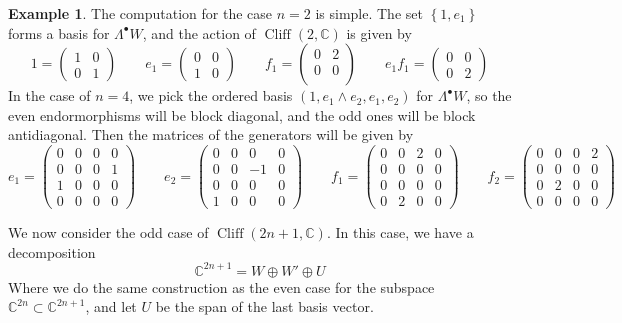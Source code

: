\documentclass[psamsfonts]{amsart}
\theoremstyle{definition}
\newtheorem{exmp}[thm]{Example}
\theoremstyle{remark}
\newcommand{\C}{\mathbb{C}}
\newcommand{\set}[1]{\left\lbrace #1 \right\rbrace}
\DeclareMathOperator{\Cliff}{Cliff}
\begin{document}
\begin{exmp}
The computation for the case $n = 2$ is simple. The set $\set{1, e_1}$ forms a basis for $\Lambda^\bullet W$, and the action of $\Cliff(2,\C)$ is given by
\[
1 = \begin{pmatrix}
1 & 0 \\
0 & 1
\end{pmatrix} \qquad e_1 = \begin{pmatrix}
0 & 0 \\
1 & 0
\end{pmatrix} \qquad f_1 = \begin{pmatrix}
0 & 2 \\
0 & 0 \\
\end{pmatrix} \qquad e_1f_1 = \begin{pmatrix}
0 & 0 \\
0 & 2
\end{pmatrix}
\]
In the case of $n=4$, we pick the ordered basis $(1, e_1 \wedge e_2, e_1, e_2)$ for $\Lambda^\bullet W$, so the even endormorphisms will be block diagonal, and the odd ones will be block antidiagonal. Then the matrices of the generators will be given by
\[
e_1 = \begin{pmatrix}
0 & 0 & 0 & 0 \\
0 & 0 & 0 & 1 \\
1 & 0 & 0 & 0 \\
0 & 0 & 0 & 0
\end{pmatrix} \qquad e_2 = \begin{pmatrix}
0 & 0 & 0 & 0 \\
0 & 0 & -1 & 0 \\
0 & 0 & 0 & 0 \\
1 & 0 & 0 & 0 
\end{pmatrix} \qquad f_1 = \begin{pmatrix}
0 & 0 & 2 & 0 \\
0 & 0 & 0 & 0 \\
0 & 0 & 0 & 0 \\
0 & 2 & 0 & 0
\end{pmatrix} \qquad f_2 = \begin{pmatrix}
0 & 0 & 0 & 2 \\
0 & 0 & 0 & 0 \\
0 & 2 & 0 & 0 \\
0 & 0 & 0 & 0
\end{pmatrix}
\]
\end{exmp}
%
We now consider the odd case of $\Cliff(2n + 1, \C)$. In this case, we have a decomposition 
\[
\C^{2n+1} = W \oplus W' \oplus U
\]
Where we do the same construction as the even case for the subspace $\C^{2n} \subset \C^{2n+1}$, and let $U$ be the span of the last basis vector.
%
\end{document}
